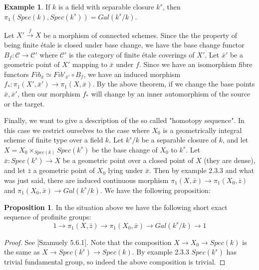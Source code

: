 \documentclass{ucbthesis}
\theoremstyle{definition}
\newtheorem{exm}[thm]{Example}
\theoremstyle{theorem}
\newtheorem{prop}[thm]{Proposition}
\begin{document}
\begin{exm} If $k$ is a field with separable closure $k^{s}$, then $\pi_{1}(Spec(k),Spec(k^{s})) = Gal(k^{s}/k)$.\end{exm}

Let $X'\xrightarrow{f} X$ be a morphism of connected schemes. Since the the property of being finite \'{e}tale is closed under base change, we have the base change functor $B_{f}: \mathcal{C} \rightarrow \mathcal{C}'$ where $\mathcal{C}'$ is the category of finite \'{e}tale coverings of $X'$. Let $\bar{x}'$ be a geometric point of $X'$ mapping to $\bar{x}$ under $f$. Since we have an isomorphism fibre functors  $Fib_{\bar{x}} \simeq Fib'_{\bar{x}'}\circ B_{f}$, we have an induced morphism $f_{*}:\pi_{1}(X',\bar{x}') \rightarrow \pi_{1}(X,\bar{x})$. By the above theorem, if  we change the base points $\bar{x},\bar{x}'$, then our morphism $f_{*}$ will change by an inner automorphism of the source or the target.  

Finally, we want to give a description of the so called "homotopy sequence". In this case we restrict
 ourselves to the case where $X_{0}$ is a geometrically integral scheme of finite type over a field $k$. Let $k^{s}/k$ be a separable 
 closure of $k$, and let $X = X_0\times_{Spec(k)}Spec(k^{s})$ be the base change of $X_{0}$ to $k^{s}$. Let 
 $\bar{x}:Spec(k^{s})\rightarrow X$ be a geometric point over a closed point of $X$ (they are dense), and let $\bar{z}$ a geometric point of $X_{0}$ lying under $\bar{x}$. Then by example 2.3.3 and what was just said, there are induced continuous morphism $\pi_{1}(X,\bar{x})\rightarrow \pi_{1}(X_{0},\bar{z})$ and 
 $\pi_{1}(X_{0},\bar{x})\rightarrow Gal(k^{s}/k)$. We have the following proposition:

\begin{prop}
In the situation above we have the following short exact sequence of profinite groups:
$$1\rightarrow \pi_{1}(X,\bar{z})\rightarrow \pi_{1}(X_{0},\bar{x}) \rightarrow Gal(k^{s}/k) \rightarrow 1$$
\end{prop}
\begin{proof}
See [Szamuely 5.6.1]. Note that the composition $X\rightarrow X_0 \rightarrow Spec(k)$ is the same as $X\rightarrow Spec(k^{s}) \rightarrow Spec(k)$. By example 2.3.3 $Spec(k^{s})$ has trivial fundamental group, so indeed the above composition is trivial. 
\end{proof}
\end{document}
